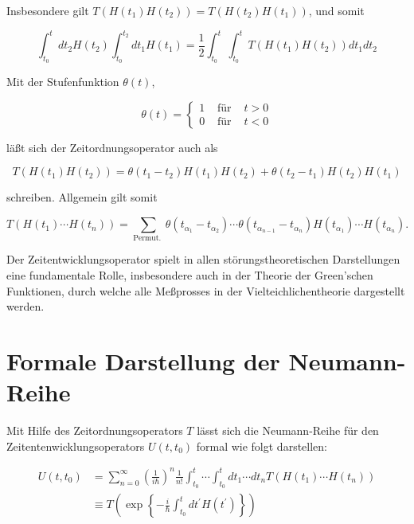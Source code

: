 \documentclass[10pt, letterpaper]{article}
\begin{document}
Insbesondere gilt $T\left(H\left(t_{1}\right) H\left(t_{2}\right)\right)=T\left(H\left(t_{2}\right) H\left(t_{1}\right)\right)$, und somit

$$
\int_{t_{0}}^{t} d t_{2} H\left(t_{2}\right) \int_{t_{0}}^{t_{2}} d t_{1} H\left(t_{1}\right)=\frac{1}{2} \int_{t_{0}}^{t} \int_{t_{0}}^{t} T\left(H\left(t_{1}\right) H\left(t_{2}\right)\right) d t_{1} d t_{2}
$$

Mit der Stufenfunktion $\theta(t)$,

$$
\theta(t)=\left\{\begin{array}{lll}
1 & \text { für } & t>0 \\
0 & \text { für } & t<0
\end{array}\right.
$$

läßt sich der Zeitordnungsoperator auch als

$$
T\left(H\left(t_{1}\right) H\left(t_{2}\right)\right)=\theta\left(t_{1}-t_{2}\right) H\left(t_{1}\right) H\left(t_{2}\right)+\theta\left(t_{2}-t_{1}\right) H\left(t_{2}\right) H\left(t_{1}\right)
$$

schreiben. Allgemein gilt somit

$$
T\left(H\left(t_{1}\right) \cdots H\left(t_{n}\right)\right)=\sum_{\text {Permut. }} \theta\left(t_{\alpha_{1}}-t_{\alpha_{2}}\right) \cdots \theta\left(t_{\alpha_{n-1}}-t_{\alpha_{n}}\right) H\left(t_{\alpha_{1}}\right) \cdots H\left(t_{\alpha_{n}}\right) .
$$

Der Zeitentwicklungsoperator spielt in allen störungstheoretischen Darstellungen eine fundamentale Rolle, insbesondere auch in der Theorie der Green'schen Funktionen, durch welche alle Meßprosses in der Vielteichlichentheorie dargestellt werden.

\section*{Formale Darstellung der Neumann-Reihe}
Mit Hilfe des Zeitordnungsoperators $T$ lässt sich die Neumann-Reihe für den Zeitentenwicklungsoperators $U\left(t, t_{0}\right)$ formal wie folgt darstellen:

$$
\begin{aligned}
U\left(t, t_{0}\right) & =\sum_{n=0}^{\infty}\left(\frac{1}{i \hbar}\right)^{n} \frac{1}{n!} \int_{t_{0}}^{t} \cdots \int_{t_{0}}^{t} d t_{1} \cdots d t_{n} T\left(H\left(t_{1}\right) \cdots H\left(t_{n}\right)\right) \\
& \equiv T\left(\exp \left\{-\frac{i}{\hbar} \int_{t_{0}}^{t} d t^{\prime} H\left(t^{\prime}\right)\right\}\right)
\end{aligned}
$$
\end{document}
